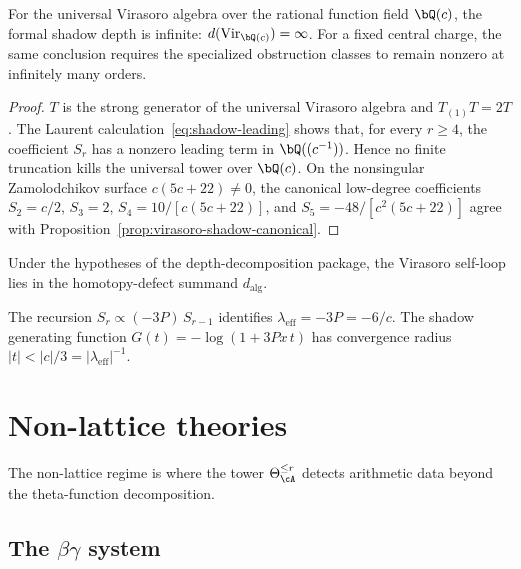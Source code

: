 \begin{corollary}
\label{cor:rigorous-infinite-depth}
\ClaimStatusProvedHere
For the universal Virasoro algebra over the rational function field
$\bQ(c)$, the formal shadow depth is infinite:
$d(\mathrm{Vir}_{\bQ(c)})=\infty$.
For a fixed central charge, the same conclusion requires the
specialized obstruction classes to remain nonzero at infinitely many
orders.
\end{corollary}

\begin{proof}
$T$ is the strong generator of the universal Virasoro algebra and
$T_{(1)}T=2T$. The Laurent calculation~\eqref{eq:shadow-leading}
shows that, for every $r\geq4$, the coefficient $S_r$ has a nonzero
leading term in $\bQ((c^{-1}))$. Hence no finite truncation kills the
universal tower over $\bQ(c)$. On the nonsingular
Zamolodchikov surface
$c(5c+22)\neq0$, the canonical low-degree coefficients
$S_2=c/2$, $S_3=2$, $S_4=10/[c(5c+22)]$, and
$S_5=-48/[c^2(5c+22)]$ agree with
Proposition~\ref{prop:virasoro-shadow-canonical}.
\end{proof}

\begin{remark}
\ClaimStatusProvedHere
Under the hypotheses of the depth-decomposition package, the Virasoro
self-loop lies in the homotopy-defect summand $d_{\mathrm{alg}}$.
\end{remark}

\begin{remark}
\label{rem:effective-coupling}
The recursion $S_r \propto (-3P)\,S_{r-1}$ identifies
$\lambda_{\mathrm{eff}} = -3P = -6/c$. The shadow generating function
$G(t) = -\log(1 + 3Px\,t)$ has convergence radius
$|t| < |c|/3 = |\lambda_{\mathrm{eff}}|^{-1}$.
\end{remark}

\section{Non-lattice theories}\label{sec:non-lattice-theories}

The non-lattice regime is where the tower
$\Theta_\cA^{\le r}$ detects arithmetic data beyond
the theta-function decomposition.

\subsection{The $\beta\gamma$ system}

